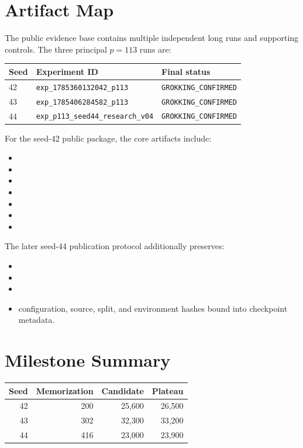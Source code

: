 \section{Artifact Map}
The public evidence base contains multiple independent long runs and supporting controls. The three principal $p=113$ runs are:

\begin{center}
\begin{tabular}{lll}
\toprule
Seed & Experiment ID & Final status \\
\midrule
42 & \texttt{exp\_1785360132042\_p113} & \texttt{GROKKING\_CONFIRMED} \\
43 & \texttt{exp\_1785406284582\_p113} & \texttt{GROKKING\_CONFIRMED} \\
44 & \texttt{exp\_p113\_seed44\_research\_v04} & \texttt{GROKKING\_CONFIRMED} \\
\bottomrule
\end{tabular}
\end{center}

For the seed-42 public package, the core artifacts include:
\begin{itemize}[leftmargin=*]
\item {}
\item {}
\item {}
\item {}
\item {}
\item {}
\item {}
\end{itemize}

The later seed-44 publication protocol additionally preserves:
\begin{itemize}[leftmargin=*]
\item {}
\item {}
\item {}
\item configuration, source, split, and environment hashes bound into checkpoint metadata.
\end{itemize}

\section{Milestone Summary}
\begin{center}
\begin{tabular}{rrrr}
\toprule
Seed & Memorization & Candidate & Plateau \\
\midrule
42 & 200 & 25{,}600 & 26{,}500 \\
43 & 302 & 32{,}300 & 33{,}200 \\
44 & 416 & 23{,}000 & 23{,}900 \\
\bottomrule
\end{tabular}
\end{center}

